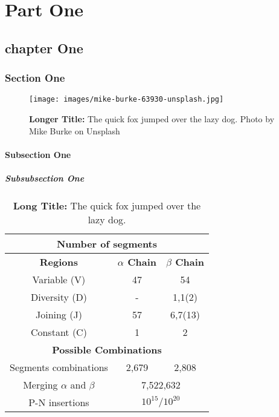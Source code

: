 \documentclass[12pt,phd ,a4paper,oneside]{ucl_thesis}
\begin{document}
	\lipsum
	
\part{Part One}\label{PartOne}
	\lipsum
\chapter{chapter One}\label{chapter1}%
	\lipsum
\section{Section One}\label{SectionOne}
	\lipsum
	
\begin{figure}[ht]
	\centering
	\texttt{[image: images/mike-burke-63930-unsplash.jpg]}
	\caption[Short Title, it goes in the table of content]{\textbf{Longer Title:} The quick fox jumped over the lazy dog. Photo by Mike Burke on Unsplash}
	\label{figure1}
\end{figure}
	\lipsum

\subsection{Subsection One}
	\lipsum
\subsubsection{Subsubsection One}
	\lipsum
	
\begin{table}[ht]
	\begin{center}
		\begin{tabular}{|c|c|c|}
			\hline \multicolumn{3}{|c|}{\textbf{Number of segments}} \\
			\hline \textbf{Regions}	& \textbf{$\alpha$ Chain} & \textbf{$\beta$ Chain} \\ 
			\hline Variable (V) & 47 & 54 \\ 
			\hline Diversity (D)& - & 1,1(2) \\ 
			\hline Joining (J)	& 57 & 6,7(13) \\ 
			\hline Constant (C) & 1 & 2 \\ 
			\hline \multicolumn{3}{|c|}{\textbf{Possible Combinations}} \\
			\hline Segments combinations & 2,679 & 2,808\\
			\hline Merging $\alpha$ and $\beta$ & \multicolumn{2}{c|}{7,522,632} \\
			\hline P-N insertions & \multicolumn{2}{c|}{$10^{15}/10^{20}$} \\
			\hline 
		\end{tabular}
		\caption[Short Title]{\textbf{Long Title:} The quick fox jumped over the lazy dog.}
		\label{table1}
	\end{center}	
\end{table}
\end{document}
